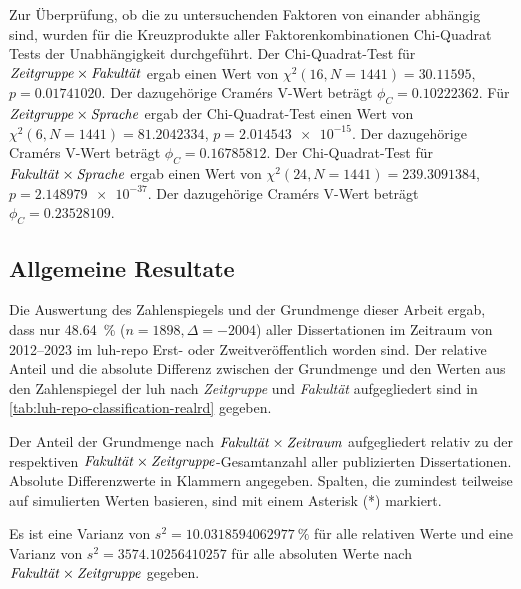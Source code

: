 Zur Überprüfung, ob die zu untersuchenden Faktoren von einander abhängig sind, wurden für die Kreuzprodukte aller Faktorenkombinationen Chi-Quadrat Tests der Unabhängigkeit durchgeführt.
Der Chi-Quadrat-Test für $\text{\textit{Zeitgruppe}}\times\text{\textit{Fakultät}}$ ergab einen Wert von $\chi^2 (\num{16}, N = \num{1441}) = \num[round-mode=places,round-precision=3]{30.11595}$, $p = \num[round-mode=places,round-precision=3]{0.01741020}$.
Der dazugehörige Cramérs V-Wert beträgt $\phi_C=\num[round-mode=places,round-precision=3]{0.10222362}$.
Für $\text{\textit{Zeitgruppe}}\times\text{\textit{Sprache}}$ ergab der Chi-Quadrat-Test einen Wert von $\chi^2 (\num{6}, N = \num{1441}) = \num[round-mode=places,round-precision=3]{81.2042334}$, $p = \num[round-mode=places,round-precision=3]{2.014543e-15}$.
Der dazugehörige Cramérs V-Wert beträgt $\phi_C=\num[round-mode=places,round-precision=3]{0.16785812}$.
Der Chi-Quadrat-Test für $\text{\textit{Fakultät}}\times\text{\textit{Sprache}}$ ergab einen Wert von $\chi^2 (\num{24}, N = \num{1441}) = \num[round-mode=places,round-precision=3]{239.3091384}$, $p = \num[round-mode=places,round-precision=3]{2.148979e-37}$.
Der dazugehörige Cramérs V-Wert beträgt $\phi_C=\num[round-mode=places,round-precision=3]{0.23528109}$.


\subsection{Allgemeine Resultate}\label{sec:luh-repo-results-general}
Die Auswertung des Zahlenspiegels und der Grundmenge dieser Arbeit ergab, dass nur \SI{48,64}{\percent} ($n=\num{1898},\Delta=\num{-2004}$) aller Dissertationen im Zeitraum von 2012--2023 im \gls{luh-repo} Erst- oder Zweitveröffentlich worden sind.
Der relative Anteil und die absolute Differenz zwischen der Grundmenge und den Werten aus den Zahlenspiegel der \gls{luh} nach \textit{Zeitgruppe} und \textit{Fakultät} aufgegliedert sind in \cref{tab:luh-repo-classification-realrd} gegeben.
\begin{table}[!htbp]
	\caption{Der Anteil der Grundmenge nach $\text{\textit{Fakultät}}\times\text{\textit{Zeitraum}}$ aufgegliedert relativ zu der respektiven $\text{\textit{Fakultät}}\times\text{\textit{Zeitgruppe}}$-Gesamtanzahl aller publizierten Dissertationen.
    Absolute Differenzwerte in Klammern angegeben.
    Spalten, die zumindest teilweise auf simulierten Werten basieren, sind mit einem Asterisk (*) markiert.}
    
    \label{tab:luh-repo-zahlenspiegel-relative-grundmenge}
\end{table}
Es ist eine Varianz von $s^2=\SI[round-mode=places,round-precision=3]{10.0318594062977}{\percent}$ für alle relativen Werte und eine Varianz von $s^2=\num[round-mode=places,round-precision=3]{3574.10256410257}$ für alle absoluten Werte nach $\text{\textit{Fakultät}}\times\text{\textit{Zeitgruppe}}$ gegeben.

